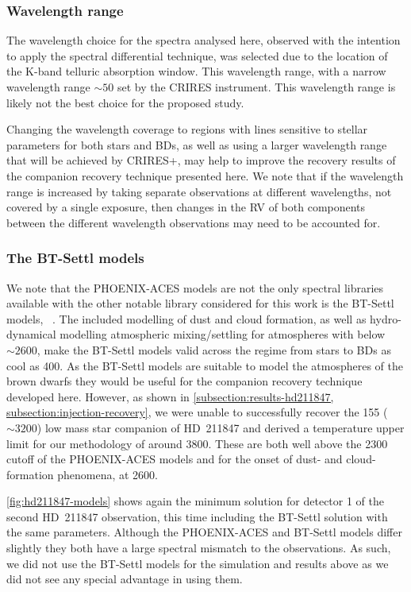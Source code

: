 \subsubsection {Wavelength range}
\label{subsubsec:wavelenght_range_limitation}
The wavelength choice for the spectra analysed here, observed with the intention to apply the spectral differential technique, was selected due to the location of the K-band telluric absorption window.
This wavelength range, with a narrow wavelength range \(\sim50\)\nm{} set by the CRIRES instrument.
This wavelength range is likely not the best choice for the proposed study.

Changing the wavelength coverage to regions with lines sensitive to stellar parameters for both stars and {BD}s, as well as using a larger wavelength range that will be achieved by CRIRES+, may help to improve the recovery results of the companion recovery technique presented here.
We note that if the wavelength range is increased by taking separate observations at different wavelengths, not covered by a single exposure, then changes in the {RV} of both components between the different wavelength observations may need to be accounted for.


\subsubsection{The {BT-Settl} models}
\label{subsubsec:bt-settl}
We note that the {PHOENIX-ACES} models are not the only spectral libraries available with the other notable library considered for this work is the {BT-Settl} models, ~\citep{allard_model_2010,allard_btsettl_2013,baraffe_new_2015}.
The included modelling of dust and cloud formation, as well as hydro-dynamical modelling atmospheric mixing/settling for atmospheres with \Teff{} below \(\sim2600\)\K{}, make the {BT-Settl} models valid across the regime from stars to {BD}s as cool as 400\K{}.
As the {BT-Settl} models are suitable to model the atmospheres of the brown dwarfs they would be useful for the companion recovery technique developed here.
However, as shown in \cref{subsection:results-hd211847, subsection:injection-recovery}, we were unable to successfully recover the 155\Mjup{} (\Teff{}\(\sim3200\)\K{}) low mass star companion of {HD~211847} and derived a temperature upper limit for our methodology of around 3800\K{}.
These are both well above the 2300\K{} cutoff of the {PHOENIX-ACES} models and for the onset of dust- and cloud-formation phenomena, at 2600\K{}.

\cref{fig:hd211847-models} shows again the minimum \textchisquared{} solution for detector 1 of the second {HD~211847} observation, this time including the {BT-Settl} solution with the same parameters.
Although the {PHOENIX-ACES} and {BT-Settl} models differ slightly they both have a large spectral mismatch to the observations.
As such, we did not use the {BT-Settl} models for the simulation and results above as we did not see any special advantage in using them.

